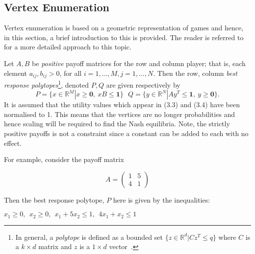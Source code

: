 \subsection{Vertex Enumeration}\label{subsec:Vertex_Enumeration}
Vertex enumeration is based on a geometric representation of games and hence,
in this section, a brief introduction to this is provided. The reader is
referred to~\cite{NoamNisan2007} for a more detailed approach to this topic.

\begin{definition}
    Let \(A, B\) be \emph{positive} payoff matrices for the row and column
    player; that is, each element \(a_{ij}, b_{ij} > 0\), for all \(i = 1,
    \ldots, M, j = 1, \ldots, N\). Then the row, column
    \textit{best response polytopes}\footnote{In general, a
    \emph{polytope} is defined as a bounded set \( \{z \in \mathbb{R}^{d} |
    Cz^{T} \le q\} \) where \(C\) is a \(k \times d\) matrix and \(z\) is a \(1
    \times d\) vector~\cite{NoamNisan2007}.}, denoted \(P, Q\) are given respectively by
    \begin{equation}
        P = \{x \in \mathbb{R}^{M} | x \ge \textbf{0}, ~ xB \le \textbf{1}\} ~~~
        Q = \{y \in \mathbb{R}^{N} | Ay^{T} \le \textbf{1}, ~ y \ge \textbf{0}\}.
    \end{equation}
    It is assumed that the utility values which appear
    in (3.3) and (3.4) have been normalised
    to 1. This means that the vertices are no longer probabilities and hence
    scaling will be required to find the Nash equilibria. Note, the strictly
    positive payoffs is not a constraint since a constant can be added to each
    with no effect. 
\end{definition}\label{def:best_resp_polytopes}


For example, consider the payoff matrix 

\begin{equation}
    A = \begin{pmatrix}
        1 & 5 \\
        4 & 1
    \end{pmatrix}
\end{equation}\label{eqn:ex_vert_en}

Then the best response polytope, \(P\) here is given by the inequalities:
\begin{center}
    \(
        x_{1} \ge 0, ~~
        x_{2} \ge 0, ~~
        x_{1} + 5x_{2} \le 1, ~~
        4x_{1} + x_{2} \le 1
    \)
\end{center}

